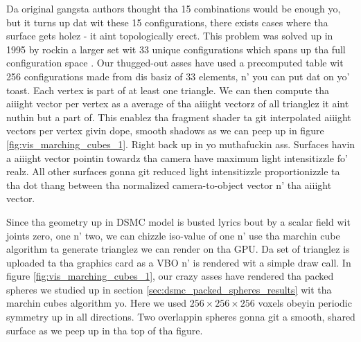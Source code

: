 Da original gangsta authors thought tha 15 combinations would be enough yo, but it turns up dat wit these 15 configurations, there exists cases where tha surface gets holez - it aint topologically erect. This problem was solved up in 1995 by rockin a larger set wit 33 unique configurations which spans up tha full configuration space \cite{chernyaev1995marching}. Our thugged-out asses have used a precomputed table wit 256 configurations made from dis basiz of 33 elements, n' you can put dat on yo' toast. Each vertex is part of at least one triangle. We can then compute tha aiiight vector per vertex as a average of tha aiiight vectorz of all trianglez it aint nuthin but a part of. This enablez tha fragment shader ta git interpolated aiiight vectors per vertex givin dope, smooth shadows as we can peep up in figure \ref{fig:vis_marching_cubes_1}. Right back up in yo muthafuckin ass. Surfaces havin a aiiight vector pointin towardz tha camera have maximum light intensitizzle fo' realz. All other surfaces gonna git reduced light intensitizzle proportionizzle ta tha dot thang between tha normalized camera-to-object vector n' tha aiiight vector.

Since tha geometry up in DSMC model is busted lyrics bout by a scalar field wit joints zero, one n' two, we can chizzle iso-value of one n' use tha marchin cube algorithm ta generate trianglez we can render on tha GPU. Da set of trianglez is uploaded ta tha graphics card as a VBO n' is rendered wit a simple draw call. In figure \ref{fig:vis_marching_cubes_1}, our crazy asses have rendered tha packed spheres we studied up in section \ref{sec:dsmc_packed_spheres_results} wit tha marchin cubes algorithm yo. Here we used $256\times256\times256$ voxels obeyin periodic symmetry up in all directions. Two overlappin spheres gonna git a smooth, shared surface as we peep up in tha top of tha figure.

